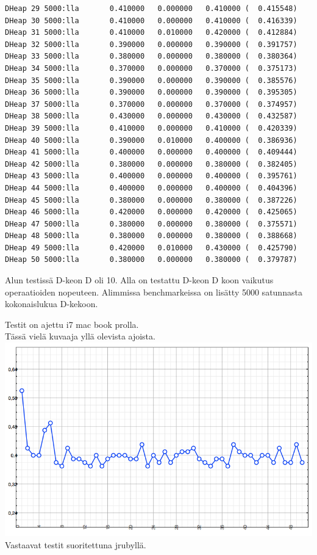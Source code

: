 \documentclass[a4paper,12pt]{article}
\begin{document}
\begin{verbatim}
DHeap 29 5000:lla       0.410000   0.000000   0.410000 (  0.415548)
DHeap 30 5000:lla       0.410000   0.000000   0.410000 (  0.416339)
DHeap 31 5000:lla       0.410000   0.010000   0.420000 (  0.412884)
DHeap 32 5000:lla       0.390000   0.000000   0.390000 (  0.391757)
DHeap 33 5000:lla       0.380000   0.000000   0.380000 (  0.380364)
DHeap 34 5000:lla       0.370000   0.000000   0.370000 (  0.375173)
DHeap 35 5000:lla       0.390000   0.000000   0.390000 (  0.385576)
DHeap 36 5000:lla       0.390000   0.000000   0.390000 (  0.395305)
DHeap 37 5000:lla       0.370000   0.000000   0.370000 (  0.374957)
DHeap 38 5000:lla       0.430000   0.000000   0.430000 (  0.432587)
DHeap 39 5000:lla       0.410000   0.000000   0.410000 (  0.420339)
DHeap 40 5000:lla       0.390000   0.010000   0.400000 (  0.386936)
DHeap 41 5000:lla       0.400000   0.000000   0.400000 (  0.409444)
DHeap 42 5000:lla       0.380000   0.000000   0.380000 (  0.382405)
DHeap 43 5000:lla       0.400000   0.000000   0.400000 (  0.395761)
DHeap 44 5000:lla       0.400000   0.000000   0.400000 (  0.404396)
DHeap 45 5000:lla       0.380000   0.000000   0.380000 (  0.387226)
DHeap 46 5000:lla       0.420000   0.000000   0.420000 (  0.425065)
DHeap 47 5000:lla       0.380000   0.000000   0.380000 (  0.375571)
DHeap 48 5000:lla       0.380000   0.000000   0.380000 (  0.388668)
DHeap 49 5000:lla       0.420000   0.010000   0.430000 (  0.425790)
DHeap 50 5000:lla       0.380000   0.000000   0.380000 (  0.379787)
\end{verbatim} 
\normalsize
Alun testissä  D-keon D oli 10. Alla on testattu D-keon D koon vaikutus operaatioiden nopeuteen. Alimmissa benchmarkeissa on lisätty 5000 satunnasta kokonaislukua D-kekoon.

Testit on ajettu i7 mac book prolla.\\
Tässä vielä kuvaaja yllä olevista ajoista.\\
\includegraphics[scale=0.55]{graph.png}
\newpage
Vastaavat testit suoritettuna jrubyllä.
\end{document}

